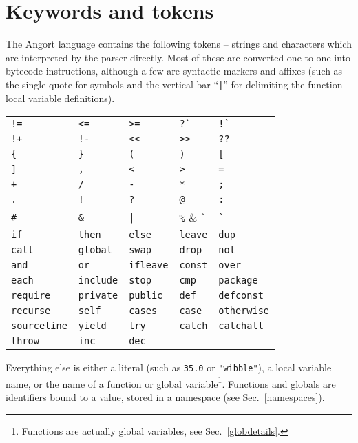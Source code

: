 \clearpage
\section{Keywords and tokens}
The Angort language contains the following tokens -- strings and characters which are
interpreted by the parser directly. Most of
these are converted one-to-one into bytecode instructions, although a few
are syntactic markers and affixes (such as the single quote for symbols and
the vertical bar ``\verb+|+'' for delimiting the function local variable definitions).
\begin{center}
\begin{tabular}{|l|l|l|l|l|}\hline
\verb+!=+ & \verb+<=+ & \verb+>=+ & \verb+?`+ & \verb+!`+\\
\verb-!+- & \verb+!-+ & \verb+<<+ & \verb+>>+ & \verb+??+\\
\verb+{+ & \verb+}+ & \verb+(+ & \verb+)+ & \verb+[+\\
\verb+]+ & \verb+,+ & \verb+<+ & \verb+>+ & \verb+=+\\
\verb-+- & \verb+/+ & \verb+-+ & \verb+*+ & \verb+;+\\
\verb+.+ & \verb+!+ & \verb+?+ & \verb+@+ & \verb+:+\\
\verb+#+ & \verb+&+ & \verb+|+ & \verb+%+ & \verb+`+\\
\verb+if+ & \verb+then+ & \verb+else+ & \verb+leave+ & \verb+dup+\\
\verb+call+ & \verb+global+ & \verb+swap+ & \verb+drop+ & \verb+not+\\
\verb+and+ & \verb+or+ & \verb+ifleave+ & \verb+const+ & \verb+over+\\
\verb+each+ & \verb+include+ & \verb+stop+ & \verb+cmp+ & \verb+package+\\
\verb+require+ & \verb+private+ & \verb+public+ & \verb+def+ & \verb+defconst+\\
\verb+recurse+ & \verb+self+ & \verb+cases+ & \verb+case+ & \verb+otherwise+\\
\verb+sourceline+ & \verb+yield+ & \verb+try+ & \verb+catch+ & \verb+catchall+\\
\verb+throw+ & \verb+inc+ & \verb+dec+ &  & \\
\hline\end{tabular}
\end{center}
Everything else is either a literal (such as \texttt{35.0} or \verb+"wibble"+),
a local variable name, or the name of a function or global variable\footnote{Functions
are actually global variables, see Sec.~\ref{globdetails}.}.
Functions and globals are identifiers bound to a value, stored in a namespace (see Sec.~\ref{namespaces}).



